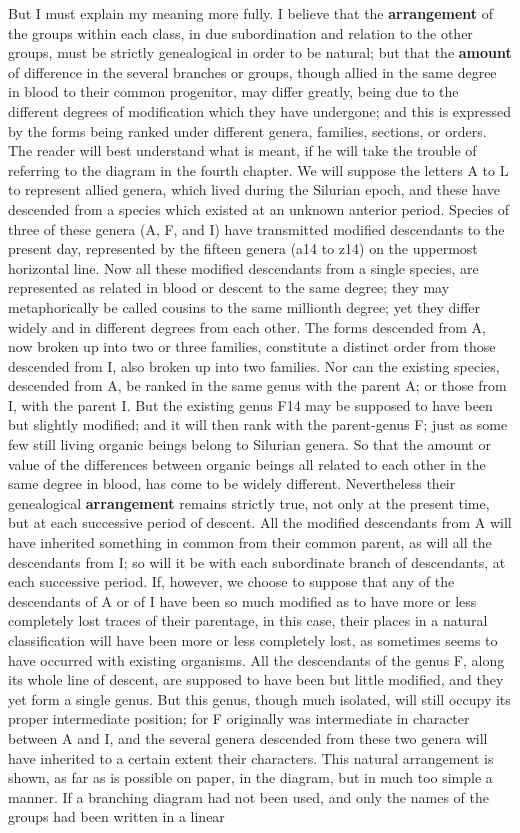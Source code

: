 \indent But I must explain my meaning more fully. I believe that the \textbf{arrangement} of the groups within each class, in due subordination and relation to the other groups, must be strictly genealogical in order to be natural; but that the \textbf{amount} of difference in the several branches or groups, though allied in the same degree in blood to their common progenitor, may differ greatly, being due to the different degrees of modification which they have undergone; and this is expressed by the forms being ranked under different genera, families, sections, or orders. The reader will best understand what is meant, if he will take the trouble of referring to the diagram in the fourth chapter. We will suppose the letters A to L to represent allied genera, which lived during the Silurian epoch, and these have descended from a species which existed at an unknown anterior period. Species of three of these genera (A, F, and I) have transmitted modified descendants to the present day, represented by the fifteen genera (a14 to z14) on the uppermost horizontal line. Now all these modified descendants from a single species, are represented as related in blood or descent to the same degree; they may metaphorically be called cousins to the same millionth degree; yet they differ widely and in different degrees from each other. The forms descended from A, now broken up into two or three families, constitute a distinct order from those descended from I, also broken up into two families. Nor can the existing species, descended from A, be ranked in the same genus with the parent A; or those from I, with the parent I. But the existing genus F14 may be supposed to have been but slightly modified; and it will then rank with the parent-genus F; just as some few still living organic beings belong to Silurian genera. So that the amount or value of the differences between organic beings all related to each other in the same degree in blood, has come to be widely different. Nevertheless their genealogical \textbf{arrangement} remains strictly true, not only at the present time, but at each successive period of descent. All the modified descendants from A will have inherited something in common from their common parent, as will all the descendants from I; so will it be with each subordinate branch of descendants, at each successive period. If, however, we choose to suppose that any of the descendants of A or of I have been so much modified as to have more or less completely lost traces of their parentage, in this case, their places in a natural classification will have been more or less completely lost, as sometimes seems to have occurred with existing organisms. All the descendants of the genus F, along its whole line of descent, are supposed to have been but little modified, and they yet form a single genus. But this genus, though much isolated, will still occupy its proper intermediate position; for F originally was intermediate in character between A and I, and the several genera descended from these two genera will have inherited to a certain extent their characters. This natural arrangement is shown, as far as is possible on paper, in the diagram, but in much too simple a manner. If a branching diagram had not been used, and only the names of the groups had been written in a linear 